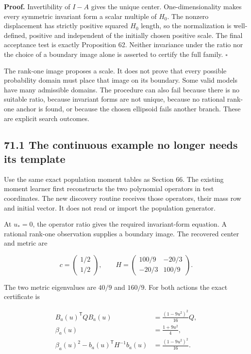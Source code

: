 \documentclass[11pt,letterpaper]{article}
\begin{document}
\textbf{Proof.} Invertibility of \(I-A\) gives the unique center.
One-dimensionality makes every symmetric invariant form a scalar
multiple of \(H_0\). The nonzero displacement has strictly positive
squared \(H_0\) length, so the normalization is well-defined, positive
and independent of the initially chosen positive scale. The final
acceptance test is exactly Proposition 62. Neither invariance under the
ratio nor the choice of a boundary image alone is asserted to certify
the full family. \(\square\)

The rank-one image proposes a scale. It does not prove that every
possible probability domain must place that image on its boundary. Some
valid models have many admissible domains. The procedure can also fail
because there is no suitable ratio, because invariant forms are not
unique, because no rational rank-one anchor is found, or because the
chosen ellipsoid fails another branch. These are explicit search
outcomes.

\subsection{71.1 The continuous example no longer needs its
template}\label{the-continuous-example-no-longer-needs-its-template}

Use the same exact population moment tables as Section 66. The existing
moment learner first reconstructs the two polynomial operators in test
coordinates. The new discovery routine receives those operators, their
mass row and initial vector. It does not read
 or import the population generator.

At \(u_*=0\), the operator ratio gives the required invariant-form
equation. A rational rank-one observation supplies a boundary image. The
recovered center and metric are

\[
\boxed{
c=\begin{pmatrix}1/2\\1/2\end{pmatrix},\qquad
H=\begin{pmatrix}100/9&-20/3\\-20/3&100/9\end{pmatrix}.
}
\]

The two metric eigenvalues are \(40/9\) and \(160/9\). For both actions
the exact certificate is

\[
\begin{aligned}
B_a(u)^{\mathsf T}QB_a(u)&=\frac{(1-9u^2)^2}{16}Q,\\
\beta_a(u)&=\frac{1+9u^2}{4},\\
\beta_a(u)^2-b_a(u)^{\mathsf T}H^{-1}b_a(u)
&=\frac{(1-9u^2)^2}{16}.
\end{aligned}
\]
\end{document}
